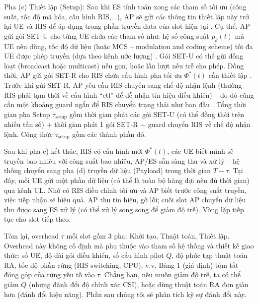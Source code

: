 Pha (c) Thiết lập (Setup): Sau khi ES tính toán xong các tham số tối ưu (công suất, tốc độ mã hóa, cấu hình RIS,...), AP sẽ gửi các thông tin thiết lập này trở lại UE và RIS để áp dụng trong phần truyền data của slot hiện tại  . Cụ thể, AP gửi gói SET-U cho từng UE chứa các tham số như: hệ số công suất $p_k(t)$ mà UE nên dùng, tốc độ dữ liệu (hoặc MCS – modulation and coding scheme) tối đa UE được phép truyền (dựa theo kênh ước lượng)  . Gói SET-U có thể gửi đồng loạt (broadcast hoặc multicast) nếu gọn, hoặc lần lượt nếu trễ cho phép. Đồng thời, AP gửi gói SET-R cho RIS chứa cấu hình pha tối ưu $\Phi^*(t)$ cần thiết lập  . Trước khi gửi SET-R, AP yêu cầu RIS chuyển sang chế độ nhận lệnh (thường RIS phải tạm thời về cấu hình “ctl” để dễ nhận tín hiệu điều khiển) – do đó cũng cần một khoảng guard ngắn để RIS chuyển trạng thái như ban đầu  . Tổng thời gian pha Setup $\tau_\text{setup}$ gồm thời gian phát các gói SET-U (có thể đồng thời trên nhiều tần số) + thời gian phát 1 gói SET-R + guard chuyển RIS về chế độ nhận lệnh. Công thức $\tau_\text{setup}$ gồm các thành phần đó.\cite{ris_latency}


Sau khi pha c) kết thúc, RIS có cấu hình mới $\Phi^*(t)$, các UE biết mình sẽ truyền bao nhiêu với công suất bao nhiêu, AP/ES sẵn sàng thu và xử lý – hệ thống chuyển sang pha (d) truyền dữ liệu (Payload) trong thời gian $T-\tau$. Tại đây, mỗi UE gửi một phần dữ liệu (có thể là toàn bộ hàng đợi nếu đủ thời gian) qua kênh UL. Nhờ có RIS điều chỉnh tối ưu và AP biết trước công suất truyền, việc tiếp nhận sẽ hiệu quả. AP thu tín hiệu, gỡ lỗi; cuối slot AP chuyển dữ liệu thu được sang ES xử lý (có thể xử lý song song để giảm độ trễ). Vòng lặp tiếp tục cho slot tiếp theo.


Tóm lại, overhead $\tau$ mỗi slot gồm 3 pha: Khởi tạo, Thuật toán, Thiết lập. Overhead này không cố định mà phụ thuộc vào tham số hệ thống và thiết kế giao thức: số UE, độ dài gói điều khiển, số cấu hình pilot $Q$, độ phức tạp thuật toán RA, tốc độ phần cứng (RIS switching, CPU), v.v. Bảng 1 (giả định) tóm tắt đóng góp của từng yếu tố vào $\tau$. Chẳng hạn, nếu muốn giảm độ trễ, ta có thể giảm $Q$ (nhưng đánh đổi độ chính xác CSI), hoặc dùng thuật toán RA đơn giản hơn (đánh đổi hiệu năng). Phần sau chúng tôi sẽ phân tích kỹ sự đánh đổi này.
